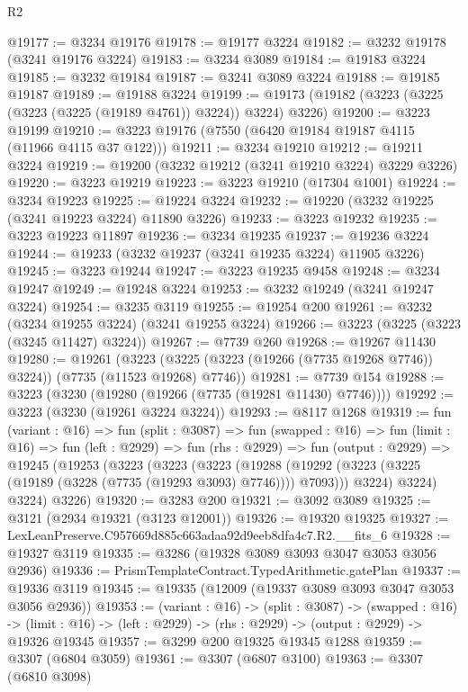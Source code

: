 \begin{lexlean}{R2}
\begin{coremodule}
@19177 := @3234 @19176
@19178 := @19177 @3224
@19182 := @3232 @19178 (@3241 @19176 @3224)
@19183 := @3234 @3089
@19184 := @19183 @3224
@19185 := @3232 @19184
@19187 := @3241 @3089 @3224
@19188 := @19185 @19187
@19189 := @19188 @3224
@19199 := @19173 (@19182 (@3223 (@3225 (@3223 (@3225 (@19189 @4761)) @3224)) @3224) @3226)
@19200 := @3223 @19199
@19210 := @3223 @19176 (@7550 (@6420 @19184 @19187 @4115 (@11966 @4115 @37 @122)))
@19211 := @3234 @19210
@19212 := @19211 @3224
@19219 := @19200 (@3232 @19212 (@3241 @19210 @3224) @3229 @3226)
@19220 := @3223 @19219
@19223 := @3223 @19210 (@17304 @1001)
@19224 := @3234 @19223
@19225 := @19224 @3224
@19232 := @19220 (@3232 @19225 (@3241 @19223 @3224) @11890 @3226)
@19233 := @3223 @19232
@19235 := @3223 @19223 @11897
@19236 := @3234 @19235
@19237 := @19236 @3224
@19244 := @19233 (@3232 @19237 (@3241 @19235 @3224) @11905 @3226)
@19245 := @3223 @19244
@19247 := @3223 @19235 @9458
@19248 := @3234 @19247
@19249 := @19248 @3224
@19253 := @3232 @19249 (@3241 @19247 @3224)
@19254 := @3235 @3119
@19255 := @19254 @200
@19261 := @3232 (@3234 @19255 @3224) (@3241 @19255 @3224)
@19266 := @3223 (@3225 (@3223 (@3245 @11427) @3224))
@19267 := @7739 @260
@19268 := @19267 @11430
@19280 := @19261
    (@3223 (@3225 (@3223 (@19266 (@7735 @19268 @7746)) @3224)) (@7735 (@11523 @19268) @7746))
@19281 := @7739 @154
@19288 := @3223 (@3230 (@19280 (@19266 (@7735 (@19281 @11430) @7746))))
@19292 := @3223 (@3230 (@19261 @3224 @3224))
@19293 := @8117 @1268
@19319 := fun (variant : @16) =>
  fun (split : @3087) =>
  fun (swapped : @16) =>
  fun (limit : @16) =>
  fun (left : @2929) =>
  fun (rhs : @2929) =>
  fun (output : @2929) =>
  @19245
    (@19253
      (@3223
        (@3223
          (@3223
            (@19288 (@19292 (@3223 (@3225 (@19189 (@3228 (@7735 (@19293 @3093) @7746)))) @7093)))
            @3224)
          @3224)
        @3224)
      @3226)
@19320 := @3283 @200
@19321 := @3092 @3089
@19325 := @3121 (@2934 @19321 (@3123 @12001))
@19326 := @19320 @19325
@19327 := LexLeanPreserve.C957669d885c663adaa92d9eeb8dfa4c7.R2.__fits_6
@19328 := @19327 @3119
@19335 := @3286 (@19328 @3089 @3093 @3047 @3053 @3056 @2936)
@19336 := PrismTemplateContract.TypedArithmetic.gatePlan
@19337 := @19336 @3119
@19345 := @19335 (@12009 (@19337 @3089 @3093 @3047 @3053 @3056 @2936))
@19353 := (variant : @16) ->
  (split : @3087) ->
  (swapped : @16) ->
  (limit : @16) -> (left : @2929) -> (rhs : @2929) -> (output : @2929) -> @19326 @19345
@19357 := @3299 @200 @19325 @19345 @1288
@19359 := @3307 (@6804 @3059)
@19361 := @3307 (@6807 @3100)
@19363 := @3307 (@6810 @3098)

\end{coremodule}
\end{lexlean}
